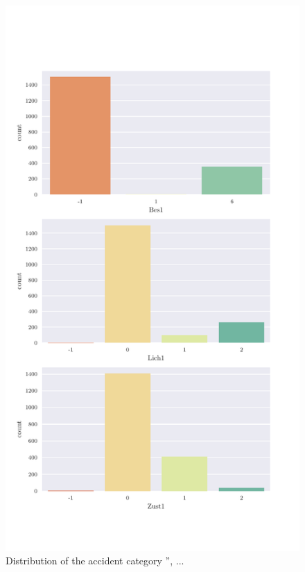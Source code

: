 \documentclass[a4paper,headsepline,footsepline,fontsize=11pt,BCOR=12mm,DIV=12]{report}
\begin{document}
\begin{appendices}
\begin{figure}[h]
	\centering
	\includegraphics[scale=0.7]{../CorrAnalysis/data/BAYSIS/02_matched/plots/baysis_matched_count_multiple04}
	\caption{Distribution of the accident category '', ...}
	\label{img:appendix_baysis_matched_04}
\end{figure}


\end{appendices}
\end{document}

